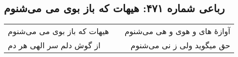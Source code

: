 \begin{center}
\section*{رباعی شماره ۴۷۱: هیهات که باز بوی می می‌شنوم}
\label{sec:sh471}
\begin{longtable}{l p{0.5cm} r}
هیهات که باز بوی می می‌شنوم
&&
آوازهٔ های و هوی و هی می‌شنوم
\\
از گوش دلم سر الهی هر دم
&&
حق میگوید ولی ز نی می‌شنوم
\\
\end{longtable}
\end{center}
